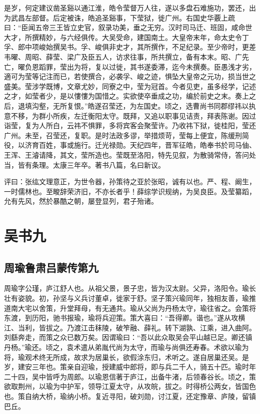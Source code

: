 \documentclass[12pt,UTF8]{ctexbook}
\begin{document}
是岁，何定建议凿圣谿以通江淮，皓令莹督万人往，遂以多盘石难施功，罢还，出为武昌左部督。后定被诛，皓追圣谿事，下莹狱，徙广州。右国史华覈上疏曰：“臣闻五帝三王皆立史官，叙录功美，垂之无穷。汉时司马迁、班固，咸命世大才，所撰精妙，与六经俱传。大吴受命，建国南土。大皇帝末年，命太史令丁孚、郎中项峻始撰吴书。孚、峻俱非史才，其所撰作，不足纪录。至少帝时，更差韦曜、周昭、薛莹、梁广及臣五人，访求往事，所共撰立，备有本末。昭、广先亡，曜负恩蹈罪，莹出为将，复以过徙，其书遂委滞，迄今未撰奏。臣愚浅才劣，適可为莹等记注而已，若使撰合，必袭孚、峻之迹，惧坠大皇帝之元功，损当世之盛美。莹涉学既博，文章尤妙，同寮之中，莹为冠首。今者见吏，虽多经学，记述之才，如莹者少，是以慺慺为国惜之。实欲使卒垂成之功，编於前史之末。奏上之后，退填沟壑，无所复恨。”皓遂召莹还，为左国史。顷之，选曹尚书同郡缪祎以执意不移，为群小所疾，左迁衡阳太守。既拜，又追以职事见诘责，拜表陈谢。因过诣莹，复为人所白，云祎不惧罪，多将宾客会聚莹许。乃收祎下狱，徙桂阳，莹还广州。未至，召莹还，复职。是时法政多谬，举措烦苛，莹每上便宜，陈缓刑简役，以济育百姓，事或施行。迁光禄勋。天纪四年，晋军征皓，皓奉书於司马伷、王浑、王濬请降，其文，莹所造也。莹既至洛阳，特先见叙，为散骑常侍，答问处当，皆有条理。太康三年卒。著书八篇，名曰新议。

评曰：张纮文理意正，为世令器，孙策待之亚於张昭，诚有以也。严、程、阚生，一时儒林也。至畯辞荣济旧，不亦长者乎！薛综学识规纳，为吴良臣。及莹纂蹈，允有先风，然於暴酷之朝，屡登显列，君子殆诸。

\part{吴书九}

\chapter{周瑜鲁肃吕蒙传第九}


周瑜字公瑾，庐江舒人也。从祖父景，景子忠，皆为汉太尉。父异，洛阳令。瑜长壮有姿貌。初，孙坚与义兵讨董卓，徙家于舒。坚子策兴瑜同年，独相友善，瑜推道南大宅以舍策，升堂拜母，有无通共。瑜从父尚为丹杨太守，瑜往省之。会策将东渡，到历阳，驰书报瑜，瑜将兵迎策。策大喜曰：“吾得卿。谐也。”遂从攻横江、当利，皆拔之。乃渡江击秣陵，破笮融、薛礼。转下湖孰、江乘，进入曲阿。刘繇奔走，而策之众已数万矣。因谓瑜曰：“吾以此众取吴会平山越已足。卿还镇丹杨。”瑜还。顷之，袁术遣从弟胤代尚为太守，而瑜与尚俱还寿春。术欲以瑜为将，瑜观术终无所成，故求为居巢长，欲假涂东归，术听之。遂自居巢还吴。是岁，建安三年也。策亲自迎瑜，授建威中郎将，即与兵二千人，骑五十匹。瑜时年二十四，吴中皆呼为周郎。以瑜恩信著于庐江，出备牛渚，后领春谷长。顷之，策欲取荆州，以瑜为中护军，领导江夏太守，从攻皖，拔之。时得桥公两女，皆国色也。策自纳大桥，瑜纳小桥。复近寻阳，破刘勋，讨江夏，还定豫章、庐陵，留镇巴丘。
\end{document}
